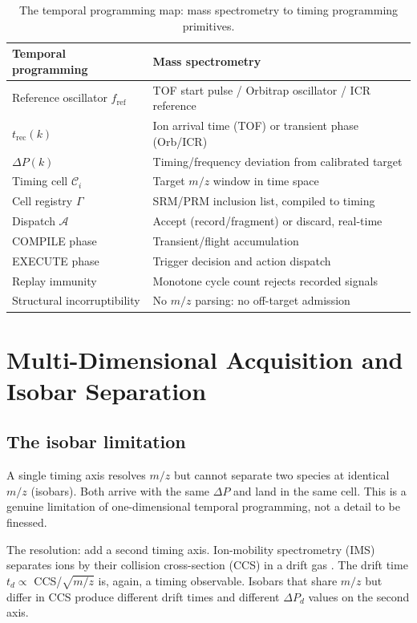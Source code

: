 \documentclass[twocolumn,10pt,a4paper]{article}
\theoremstyle{thmstyle}
\theoremstyle{definition}
\theoremstyle{remark}
\newcommand{\DP}{\Delta P}
\newcommand{\trec}{t_{\mathrm{rec}}}
\newcommand{\fref}{f_{\mathrm{ref}}}
\newcommand{\calC}{\mathcal{C}}
\newcommand{\calA}{\mathcal{A}}
\begin{document}
\begin{table}[ht]
\centering
\caption{The temporal programming map: mass spectrometry to timing
programming primitives.}
\label{tab:mapping}
\small
\begin{tabular}{p{3.8cm}p{3.8cm}}
\toprule
\textbf{Temporal programming} & \textbf{Mass spectrometry} \\
\midrule
Reference oscillator $\fref$ & TOF start pulse / Orbitrap oscillator / ICR reference \\
$\trec(k)$ & Ion arrival time (TOF) or transient phase (Orb/ICR) \\
$\DP(k)$ & Timing/frequency deviation from calibrated target \\
Timing cell $\calC_i$ & Target $m/z$ window in time space \\
Cell registry $\Gamma$ & SRM/PRM inclusion list, compiled to timing \\
Dispatch $\calA$ & Accept (record/fragment) or discard, real-time \\
COMPILE phase & Transient/flight accumulation \\
EXECUTE phase & Trigger decision and action dispatch \\
Replay immunity & Monotone cycle count rejects recorded signals \\
Structural incorruptibility & No $m/z$ parsing: no off-target admission \\
\bottomrule
\end{tabular}
\end{table}

\section{Multi-Dimensional Acquisition and Isobar Separation}
\label{sec:multidim}

\subsection{The isobar limitation}

A single timing axis resolves $m/z$ but cannot separate two species at
identical $m/z$ (isobars). Both arrive with the same $\DP$ and land in
the same cell. This is a genuine limitation of one-dimensional temporal
programming, not a detail to be finessed.

The resolution: add a second timing axis. Ion-mobility spectrometry
(IMS) separates ions by their collision cross-section (CCS) in a drift
gas \citep{clemmer1997,lanucara2014}. The drift time $t_d \propto$
CCS/$\sqrt{m/z}$ is, again, a timing observable. Isobars that share
$m/z$ but differ in CCS produce different drift times and different
$\DP_d$ values on the second axis.
\end{document}
